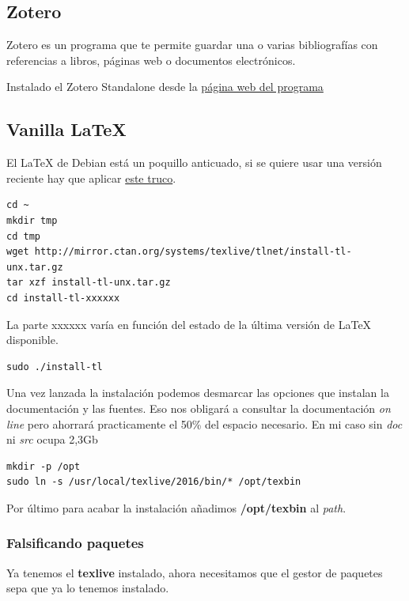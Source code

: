 \documentclass[12pt,spanish,]{scrartcl}
\begin{document}
\subsection{Zotero}\label{zotero}

Zotero es un programa que te permite guardar una o varias bibliografías
con referencias a libros, páginas web o documentos electrónicos.

Instalado el Zotero Standalone desde la
\href{https://www.zotero.org/}{página web del programa}

\subsection{Vanilla LaTeX}\label{vanilla-latex}

El LaTeX de Debian está un poquillo anticuado, si se quiere usar una
versión reciente hay que aplicar
\href{http://tex.stackexchange.com/questions/1092/how-to-install-vanilla-texlive-on-debian-or-ubuntu}{este
truco}.

\begin{verbatim}
cd ~
mkdir tmp
cd tmp
wget http://mirror.ctan.org/systems/texlive/tlnet/install-tl-unx.tar.gz
tar xzf install-tl-unx.tar.gz
cd install-tl-xxxxxx
\end{verbatim}

La parte xxxxxx varía en función del estado de la última versión de
LaTeX disponible.

\begin{verbatim}
sudo ./install-tl
\end{verbatim}

Una vez lanzada la instalación podemos desmarcar las opciones que
instalan la documentación y las fuentes. Eso nos obligará a consultar la
documentación \emph{on line} pero ahorrará practicamente el 50\% del
espacio necesario. En mi caso sin \emph{doc} ni \emph{src} ocupa 2,3Gb

\begin{verbatim}
mkdir -p /opt
sudo ln -s /usr/local/texlive/2016/bin/* /opt/texbin
\end{verbatim}

Por último para acabar la instalación añadimos \textbf{/opt/texbin} al
\emph{path}.

\subsubsection{Falsificando paquetes}\label{falsificando-paquetes}

Ya tenemos el \textbf{texlive} instalado, ahora necesitamos que el
gestor de paquetes sepa que ya lo tenemos instalado.
\end{document}
